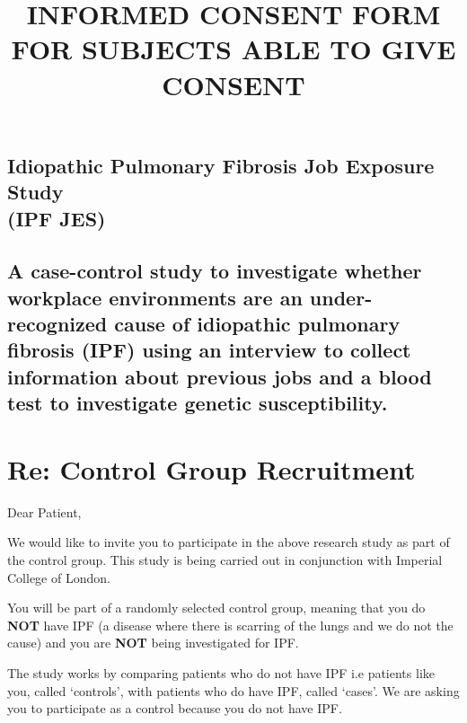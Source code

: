 \documentclass[a4paper,10pt]{article}
\begin{document}
 \newpage\title{\bf INFORMED CONSENT FORM FOR SUBJECTS ABLE TO GIVE CONSENT}
 \date{}
 
 
 \pagestyle{fancy}
 
 

 \begin{centering} 
 \section*{Idiopathic Pulmonary Fibrosis Job Exposure Study \\ (IPF JES)}
 \subsection*{A case-control study to investigate whether workplace environments are an under-recognized cause of idiopathic pulmonary fibrosis (IPF) using an interview to collect information about previous jobs and a blood test to investigate genetic susceptibility.}
 \end{centering}

 \section*{Re: Control Group Recruitment}

Dear Patient,

\vspace{0.5cm}

We would like to invite you to participate in the above research study as part of the control group. This study is being carried out in conjunction with Imperial College of London. 

You will be part of a randomly selected control group, meaning that you do \textbf{NOT} have IPF (a disease where there is scarring of the lungs and we do not the cause) and you are \textbf{NOT} being investigated for IPF. 

The study works by comparing patients who do not have IPF i.e patients like you, called ‘controls’, with patients who do have IPF, called ‘cases’. We are asking you to participate as a control because you do not have IPF.
\end{document}
